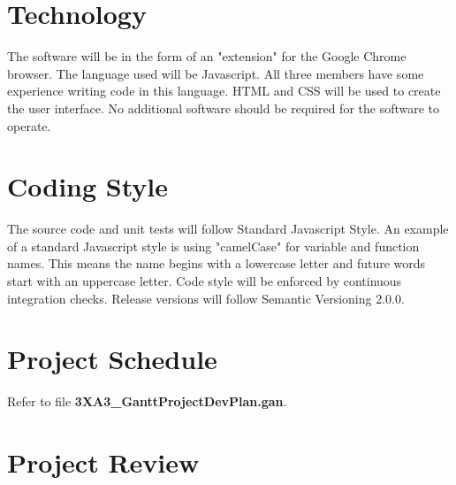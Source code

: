 \documentclass[12pt]{article}
\begin{document}
\begin{flushleft}
\section{Technology}
The software will be in the form of an "extension" for the Google Chrome browser. The language used will be Javascript. All three members have some experience writing code in this language. HTML and CSS will be used to create the user interface. No additional software should be required for the software to operate.

\section{Coding Style}
The source code and unit tests will follow Standard Javascript Style. An example of a standard Javascript style is using "camelCase" for variable and function names. This means the name begins with a lowercase letter and future words start with an uppercase letter. Code style will be enforced by continuous integration checks. Release versions will follow Semantic Versioning 2.0.0.

\section{Project Schedule}

Refer to file \textbf{3XA3\_GanttProjectDevPlan.gan}.

\section{Project Review}

\end{flushleft}
\end{document}
